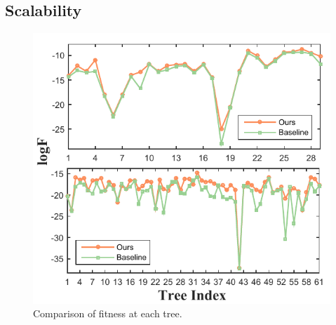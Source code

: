 %
%

\subsection{Scalability}


\begin{figure}[t]
	\centering
	\includegraphics[width=0.7\columnwidth]{fig/v2-Sf-treeindex}
	\vspace{-1mm}
	\caption{
		Comparison of fitness at each tree.}
	\vspace{-6mm}
	\label{fig:sf}
\end{figure}



